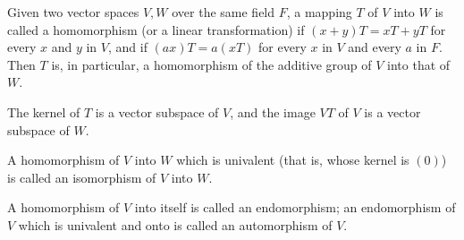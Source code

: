 Given two vector spaces $V, W$ over the same field $F$, a mapping $T$ of $V$ into $W$ is called a homomorphism (or a linear transformation) if $(x + y)T = xT + yT$ for every $x$ and $y$ in $V$, and if $(ax)T = a(xT)$ for every $x$ in $V$ and every $a$ in $F$. Then $T$ is, in particular, a homomorphism of the additive group of $V$ into that of $W$.

The kernel of $T$ is a vector subspace of $V$, and the image $VT$ of $V$ is a vector subspace of $W$.

A homomorphism of $V$ into $W$ which is univalent (that is, whose kernel is $(0)$) is called an isomorphism of $V$ into $W$.

A homomorphism of $V$ into itself is called an endomorphism; an endomorphism of $V$ which is univalent and onto is called an automorphism of $V$.
